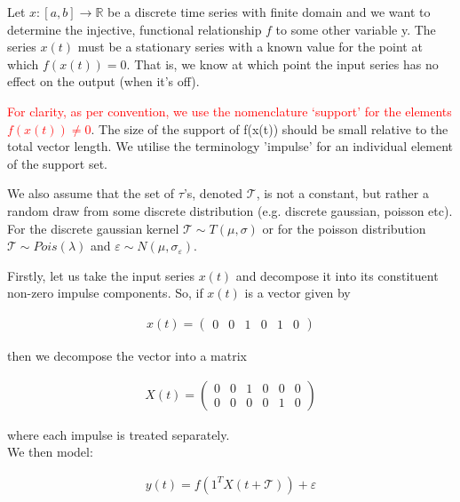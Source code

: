\documentclass[11pt]{amsart}
\begin{document}
Let $x: [a, b] \longrightarrow \mathbb{R}$ be a discrete time series with finite domain and we want to determine the injective, functional relationship $f$ to some other variable y. The series $x(t)$ must be a stationary series with a known value for the point at which $f(x(t)) = 0$.  That is, we know at which point the input series has no effect on the output (when it’s off). 

\textcolor{red}{For clarity, as per convention, we use the nomenclature ‘support’ for the elements $f(x(t)) \neq 0$}. The size of the support of f(x(t)) should be small relative to the total vector length. We utilise the terminology 'impulse' for an individual element of the support set.

We also assume that the set of $\tau$'s, denoted $\mathcal{T}$, is not a constant, but rather a random draw from some discrete distribution (e.g. discrete gaussian, poisson etc). For the discrete gaussian kernel $\mathcal{T}\sim T(\mu, \sigma)$ or for the poisson distribution $\mathcal{T}\sim Pois(\lambda)$ and $\varepsilon \sim N(\mu, \sigma_{\varepsilon})$. 

Firstly, let us take the input series $x(t)$ and decompose it into its constituent non-zero impulse components. So, if $x(t)$ is a vector given by 

\begin{align}
x(t) = 
\left(
\begin{array}{cccccc}
0 & 0 & 1 & 0 & 1 & 0
\end{array}  
\right)
\end{align}

then we decompose the vector into a matrix 

\begin{align}
X(t) = 
\left(
\begin{array}{cccccc}
0 & 0 & 1 & 0 & 0 & 0 \\
0 & 0 & 0 & 0 & 1 & 0 
\end{array}  
\right)
\end{align}

where each impulse is treated separately. \\

We then model:

\begin{align}
y(t)= f(1^TX(t + \mathcal{T})) + \varepsilon
\end{align}
\end{document}
